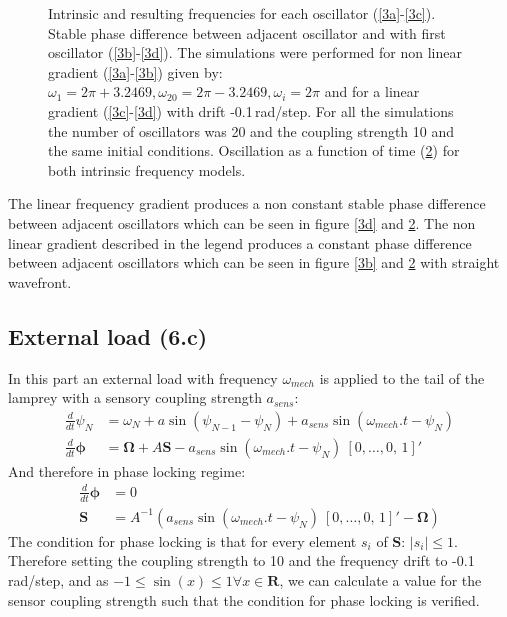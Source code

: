 \documentclass[a4paper]{scrartcl}
\begin{document}
\begin{figure}[h]
\begin{subfigure}[b]{\textwidth}
		\caption{}\label{3e}
	\end{subfigure}
	\caption{Intrinsic and resulting frequencies for each oscillator (\ref{3a}-\ref{3c}). Stable phase difference between adjacent oscillator and with first oscillator (\ref{3b}-\ref{3d}). The simulations were performed for non linear gradient (\ref{3a}-\ref{3b}) given by: $\omega_{1} = 2\pi + 3.2469 ,\omega_{20} = 2\pi - 3.2469 , \omega_{i} = 2\pi$ and for a linear gradient (\ref{3c}-\ref{3d}) with drift -0.1\,rad/step. For all the simulations the number of oscillators was 20 and the coupling strength 10 and the same initial conditions. Oscillation as a function of time (\ref{3e}) for both intrinsic frequency models.}
\end{figure}

The linear frequency gradient produces a non constant stable phase difference between  adjacent oscillators which can be seen in figure \ref{3d} and \ref{3e}. The non linear gradient described in the legend produces a constant phase difference between adjacent oscillators which can be seen in figure \ref{3b} and \ref{3e} with straight wavefront.

\subsection{External load (6.c)}
In this part an external load with frequency $\omega_{mech}$ is applied to the tail of the lamprey with a sensory coupling strength $a_{sens}$:
\begin{align*}
\frac{d}{dt}\psi_N &= \omega_N + a \sin(\psi_{N-1}-\psi_N) + a_{sens} \sin(\omega_{mech}.t-\psi_N) \\
\frac{d}{dt}\mathbf{\phi} &= \mathbf{\Omega} + A \mathbf{S} - a_{sens} \sin(\omega_{mech}.t-\psi_N)\ [0, \ldots, 0,\, 1]'
\end{align*}
And therefore in phase locking regime:
\begin{align*}
\frac{d}{dt}\mathbf{\phi} &= 0\\
\mathbf{S} &= A^{-1}(a_{sens}\sin(\omega_{mech}.t-\psi_N)\ [0, \ldots, 0,\, 1]'-\mathbf{\Omega})
\end{align*}
The condition for phase locking is that for every element $s_i$ of $\mathbf{S}$: $|s_i|\leq1$.
Therefore setting the coupling strength to 10 and the frequency drift to -0.1\,rad/step, and as $-1\leq\sin(x)\leq1 \forall x \in \mathbf{R}$, we can calculate a value for the sensor coupling strength such that the condition for phase locking is verified.
\end{document}
